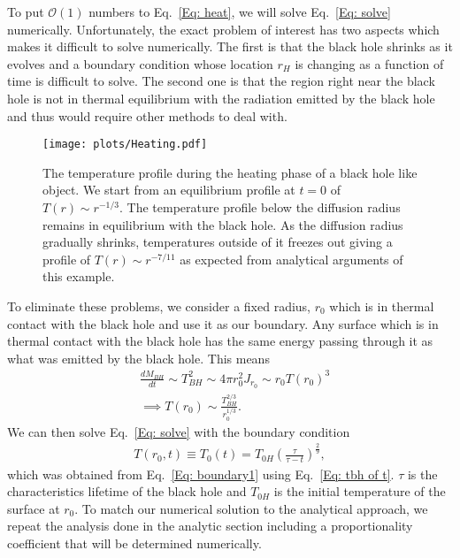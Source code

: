 \documentclass[superscriptaddress,groupedaddress,nofootnoteinbib,11pt]{article}
\newcommand\eea{\end{eqnarray}}
\newcommand\bea{\begin{eqnarray}}
\begin{document}
To put $\mathcal{O}(1)$ numbers to Eq.~\ref{Eq: heat}, we will solve Eq.~\ref{Eq: solve} numerically.
Unfortunately, the exact problem of interest has two aspects which makes it difficult to solve numerically. 
The first is that the black hole shrinks as it evolves and a boundary condition whose location $r_{H}$ is changing as a function of time is difficult to solve. 
The second one is that the region right near the black hole is not in thermal equilibrium with the radiation emitted by the black hole and thus would require other methods to deal with.\\

\begin{figure}[t]
    \centering
    \texttt{[image: plots/Heating.pdf]}
    \caption{The temperature profile during the heating phase of a black hole like object.  We start from an equilibrium profile at $t=0$ of $T(r)\sim r^{-1/3}$. The temperature profile below the diffusion radius remains in equilibrium with the black hole. As the diffusion radius gradually shrinks, temperatures outside of it freezes out giving a profile of $T(r)\sim r^{-7/11}$ as expected from analytical arguments of this example. }
    \label{fig:my_label}
\end{figure}

To eliminate these problems, we consider a fixed radius, $r_0$ which is in thermal contact with the black hole and use it as our boundary.  Any surface which is in thermal contact with the black hole has the same energy passing through it as what was emitted by the black hole. This means 
\bea
\label{Eq: boundary1}
&\frac{d M_{BH}}{dt} \sim T_{BH}^2 \sim 4 \pi r_0^2 J_{r_0} \sim r_0 T(r_0)^3\\ 
&\implies T(r_0)\sim \frac{T_{BH}^{2/3}}{r_0^{1/3}}.
\eea
We can then solve Eq.~\ref{Eq: solve} with the boundary condition
\bea
\label{Eq: boundary condition}
T(r_0,t)\equiv T_0(t)=T_{0H}\left(\frac{\tau}{\tau-t}\right)^{\frac{2}{9}},
\eea
which was obtained from Eq.~\ref{Eq: boundary1} using Eq.~\ref{Eq: tbh of t}.
$\tau$ is the characteristics lifetime of the black hole and $T_{0H}$ is the initial temperature of the surface at $r_0$.  To match our numerical solution to the analytical approach, we repeat the analysis done in the analytic section including a proportionality coefficient that will be determined numerically.
\end{document}
